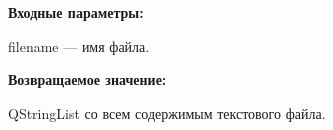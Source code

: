 \textbf{Входные параметры:}

filename --- имя файла.

\textbf{Возвращаемое значение:}

QStringList со всем содержимым текстового файла.